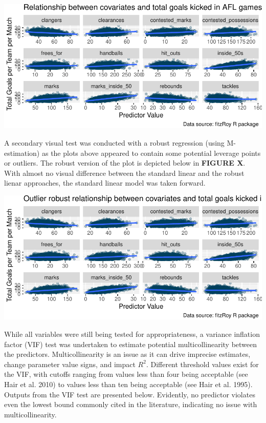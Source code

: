 \documentclass{article}
\begin{document}
\includegraphics{OLET5608_TrentHenderson_files/figure-latex/unnamed-chunk-7-1.pdf}

A secondary visual test was conducted with a robust regression (using
M-estimation) as the plots above appeared to contain some potential
leverage points or outliers. The robust version of the plot is depicted
below in \textbf{FIGURE X}. With almost no visual difference between the
standard linear and the robust lienar approaches, the standard linear
model was taken forward.

\includegraphics{OLET5608_TrentHenderson_files/figure-latex/unnamed-chunk-8-1.pdf}

While all variables were still being tested for appropriateness, a
variance inflation factor (VIF) test was undertaken to estimate
potential multicollinearity between the predictors. Multicollinearity is
an issue as it can drive imprecise estimates, change parameter value
signs, and impact \(R^2\). Different threshold values exist for the VIF,
with cutoffs ranging from values less than four being acceptable (see
Hair et al. 2010) to values less than ten being acceptable (see Hair et
al. 1995). Outputs from the VIF test are presented below. Evidently, no
predictor violates even the lowest bound commonly cited in the
literature, indicating no issue with multicollinearity.
\end{document}
